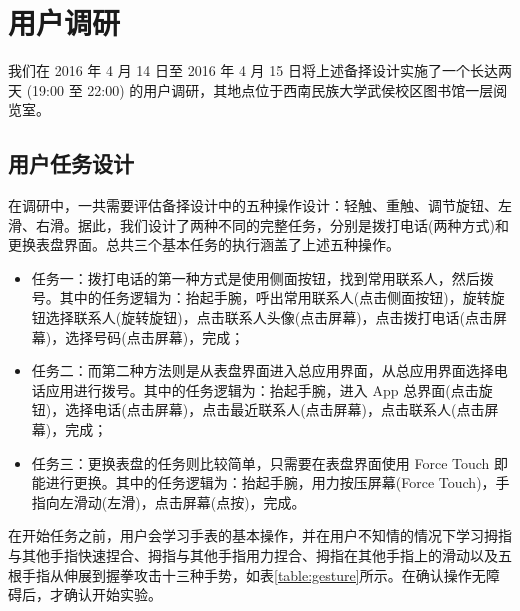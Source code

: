 \chapter{用户调研}

我们在 2016 年 4 月 14 日至 2016 年 4 月 15 日将上述备择设计实施了一个长达两天 (19:00 至 22:00) 的用户调研，其地点位于西南民族大学武侯校区图书馆一层阅览室。

\section{用户任务设计}

在调研中，一共需要评估备择设计中的五种操作设计：轻触、重触、调节旋钮、左滑、右滑。据此，我们设计了两种不同的完整任务，分别是拨打电话(两种方式)和更换表盘界面。总共三个基本任务的执行涵盖了上述五种操作。%

\begin{itemize}
    \kaishu
    \item 任务一：拨打电话的第一种方式是使用侧面按钮，找到常用联系人，然后拨号。其中的任务逻辑为：抬起手腕，呼出常用联系人(点击侧面按钮)，旋转旋钮选择联系人(旋转旋钮)，点击联系人头像(点击屏幕)，点击拨打电话(点击屏幕)，选择号码(点击屏幕)，完成；
    \item 任务二：而第二种方法则是从表盘界面进入总应用界面，从总应用界面选择电话应用进行拨号。其中的任务逻辑为：抬起手腕，进入 App 总界面(点击旋钮)，选择电话(点击屏幕)，点击最近联系人(点击屏幕)，点击联系人(点击屏幕)，完成；
    \item 任务三：更换表盘的任务则比较简单，只需要在表盘界面使用 Force Touch 即能进行更换。其中的任务逻辑为：抬起手腕，用力按压屏幕(Force Touch)，手指向左滑动(左滑)，点击屏幕(点按)，完成。
\end{itemize}

在开始任务之前，用户会学习手表的基本操作，并在用户不知情的情况下学习拇指与其他手指快速捏合、拇指与其他手指用力捏合、拇指在其他手指上的滑动以及五根手指从伸展到握拳攻击十三种手势，如表\ref{table:gesture}所示。在确认操作无障碍后，才确认开始实验。

